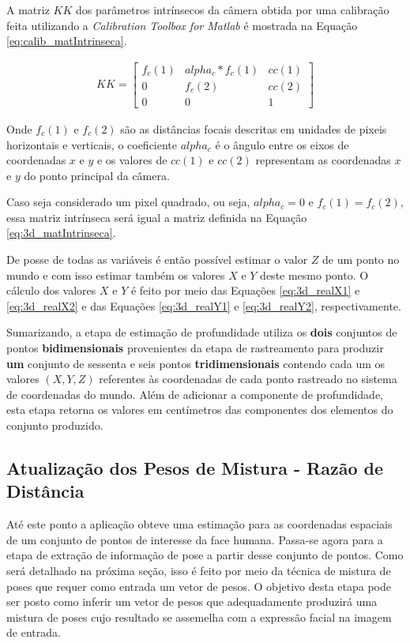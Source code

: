 A matriz $KK$ dos parâmetros intrínsecos da câmera obtida por uma calibração feita utilizando a \textit{Calibration Toolbox for Matlab} é mostrada na Equação \ref{eq:calib_matIntrinseca}.

\begin{align}
KK =
\left[\begin{array}{ccc}
f_c(1) & alpha_c*f_c(1) & cc(1)\\
0 & f_c(2) & cc(2)\\
0 & 0 & 1
\end{array}\right]
\label{eq:calib_matIntrinseca}
\end{align}

Onde $f_c(1)$ e $f_c(2)$ são as distâncias focais descritas em unidades de pixeis horizontais e verticais, o coeficiente $alpha_c$ é o ângulo entre os eixos de coordenadas $x$ e $y$ e os valores de $cc(1)$ e $cc(2)$ representam as coordenadas $x$ e $y$ do ponto principal da câmera.

Caso seja considerado um pixel quadrado, ou seja, $alpha_c = 0$ e $f_c(1) = f_c(2)$, essa matriz intrínseca será igual a matriz definida na Equação \ref{eq:3d_matIntrinseca}.

De posse de todas as variáveis é então possível estimar o valor $Z$ de um ponto no mundo e com isso estimar também os valores $X$ e $Y$ deste mesmo ponto. O cálculo dos valores $X$ e $Y$ é feito por meio das Equações \ref{eq:3d_realX1} e \ref{eq:3d_realX2} e das Equações \ref{eq:3d_realY1} e \ref{eq:3d_realY2}, respectivamente.    

Sumarizando, a etapa de estimação de profundidade utiliza os \textbf{dois} conjuntos de pontos \textbf{bidimensionais} provenientes da etapa de rastreamento para produzir \textbf{um} conjunto de sessenta e seis pontos \textbf{tridimensionais} contendo cada um os valores $(X,Y,Z)$ referentes às coordenadas de cada ponto rastreado no sistema de coordenadas do mundo. Além de adicionar a componente de profundidade, esta etapa retorna os valores em centímetros das componentes dos elementos do conjunto produzido.

\subsection{Atualização dos Pesos de Mistura - Razão de Distância}

Até este ponto a aplicação obteve uma estimação para as coordenadas espaciais de um conjunto de pontos de interesse da face humana. Passa-se agora para a etapa de extração de informação de pose a partir desse conjunto de pontos. Como será detalhado na próxima seção, isso é feito por meio da técnica de mistura de poses que requer como entrada um vetor de pesos. O objetivo desta etapa pode ser posto como inferir um vetor de pesos que adequadamente produzirá uma mistura de poses cujo resultado se assemelha com a expressão facial na imagem de entrada.


